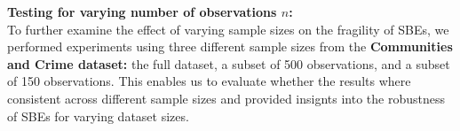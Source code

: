 \textbf{Testing for varying number of observations $n$:}\\
To further examine the effect of varying sample sizes on the fragility of SBEs, we performed experiments using three different sample sizes from the \textbf{Communities and Crime dataset:} the full dataset, a subset of 500 observations, and a subset of 150 observations. This enables us to evaluate whether the results where consistent across different sample sizes and provided insignts into the robustness of SBEs for varying dataset sizes. 
